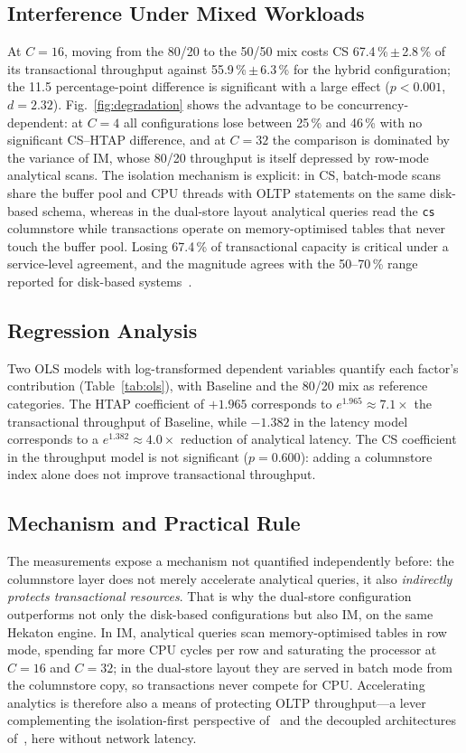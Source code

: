 \documentclass[10pt,conference,a4paper]{IEEEtran}
\begin{document}
\subsection{Interference Under Mixed Workloads}
At $C = 16$, moving from the 80/20 to the 50/50 mix costs CS
67.4\,\%\,$\pm$\,2.8\,\% of its transactional throughput against
55.9\,\%\,$\pm$\,6.3\,\% for the hybrid configuration; the 11.5
percentage-point difference is significant with a large effect
($p < 0.001$, $d = 2.32$).
Fig.~\ref{fig:degradation} shows the advantage to be concurrency-dependent:
at $C = 4$ all configurations lose between 25\,\% and 46\,\% with no
significant CS--HTAP difference, and at $C = 32$ the comparison is dominated
by the variance of IM, whose 80/20 throughput is itself depressed by
row-mode analytical scans. The isolation mechanism is explicit: in CS,
batch-mode scans share the buffer pool and CPU threads with OLTP statements
on the same disk-based schema, whereas in the dual-store layout analytical
queries read the \texttt{cs} columnstore while transactions operate on
memory-optimised tables that never touch the buffer pool. Losing 67.4\,\% of
transactional capacity is critical under a service-level agreement, and the
magnitude agrees with the 50--70\,\% range reported for disk-based
systems~\cite{wu2025}.

\subsection{Regression Analysis}
Two OLS models with log-transformed dependent variables quantify each
factor's contribution (Table~\ref{tab:ols}), with Baseline and the 80/20 mix
as reference categories. The HTAP coefficient of $+1.965$ corresponds to
$e^{1.965} \approx 7.1\times$ the transactional throughput of Baseline,
while $-1.382$ in the latency model corresponds to a
$e^{1.382} \approx 4.0\times$ reduction of analytical latency. The CS
coefficient in the throughput model is not significant ($p = 0.600$): adding
a columnstore index alone does not improve transactional throughput.

\subsection{Mechanism and Practical Rule}
The measurements expose a mechanism not quantified independently before: the
columnstore layer does not merely accelerate analytical queries, it also
\emph{indirectly protects transactional resources}. That is why the
dual-store configuration outperforms not only the disk-based configurations
but also IM, on the same Hekaton engine. In IM, analytical queries scan memory-optimised tables in row mode,
spending far more CPU cycles per row and saturating the processor at
$C = 16$ and $C = 32$; in the dual-store layout they are served in batch mode
from the columnstore copy, so transactions never compete for CPU. Accelerating analytics is therefore also a means of protecting OLTP
throughput---a lever complementing the isolation-first perspective
of~\cite{kang2023} and the decoupled architectures of~\cite{huang2020,
yang2020}, here without network latency.
\end{document}
